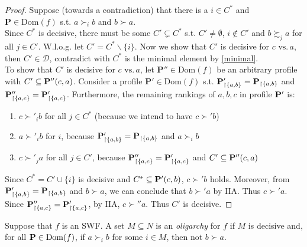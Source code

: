 \begin{proof}
    Suppose (towards a contradiction) that there is a $i \in C^\ast$ and $\mathbf{P} \in \mathrm{Dom}(f)$ s.t. $a \succ_i b$ and $b \succ a$.\\
    Since $C^\ast$ is decisive, there must be some $C' \subsetneq C^\ast$ s.t. $C' \neq \emptyset$, $i \not \in C'$ and $b \succsim_j a$ for all $j \in C'$. W.l.o.g. let $C' = C^\ast \backslash \{i\}$. Now we show that $C'$ is decisive for $c \mbox{ vs.}\, a$, then $C' \in \mathcal{D}$, contradict with $C^\ast$ is the minimal element by \cref{minimal}.\\
    To show that $C'$ is decisive for $c \mbox{ vs.}\, a$, let $\mathbf{P''} \in \mathrm{Dom}(f)$ be an arbitrary profile with $C' \subseteq \mathbf{P}''(c,a)$. Consider a profile $\mathbf{P'} \in \mathrm{Dom}(f)$ s.t. $\mathbf{P}'_{\upharpoonright \{a,b\}} = \mathbf{P}_{\upharpoonright \{a,b\}}$ and $\mathbf{P}''_{\upharpoonright \{a,c\}} = \mathbf{P}'_{\upharpoonright \{a,c\}}$. Furthermore, the remaining rankings of $a,b,c$ in profile $\mathbf{P}'$ is:
    \begin{enumerate}
        \item $c \succ'_i b$ for all $j\in C^*$ (because we intend to have $c \succ' b$)
        \item $a \succ'_i b$ for $i$, because $\mathbf{P}'_{\upharpoonright \{a,b\}} = \mathbf{P}_{\upharpoonright \{a,b\}}$ and $a \succ_i b$
        \item $c \succ'_j a$  for all $j \in C'$, because $\mathbf{P}''_{\upharpoonright \{a,c\}} = \mathbf{P}'_{\upharpoonright \{a,c\}}$ and $C'\subseteq \mathbf{P}''(c,a)$
    \end{enumerate}
    Since $C^\ast = C' \cup \{i\}$ is decisive and $C^\ast \subseteq \mathbf{P}'(c,b)$, $c \succ' b$ holds. Moreover, from $\mathbf{P}'_{\upharpoonright \{a,b\}} = \mathbf{P}_{\upharpoonright \{a,b\}}$ and $b \succ a$, we can conclude that $b \succ' a$ by IIA. Thus $c \succ' a$.\\
    Since $\mathbf{P}''_{\upharpoonright \{a,c\}} = \mathbf{P}'_{\upharpoonright \{a,c\}}$, by IIA, $c \succ'' a$. Thus $C'$ is decisive.
\end{proof}

\begin{definition}[Oligarchy]
    Suppose that $f$ is an SWF. A set $M \subseteq N$ is an \textit{oligarchy} for $f$ if $M$ is decisive and, for all $\mathbf{P} \in \mathrm{Dom}(f)$, if $a \succ_i b$ for some $i \in M$, then not $b \succ a$.
\end{definition}

